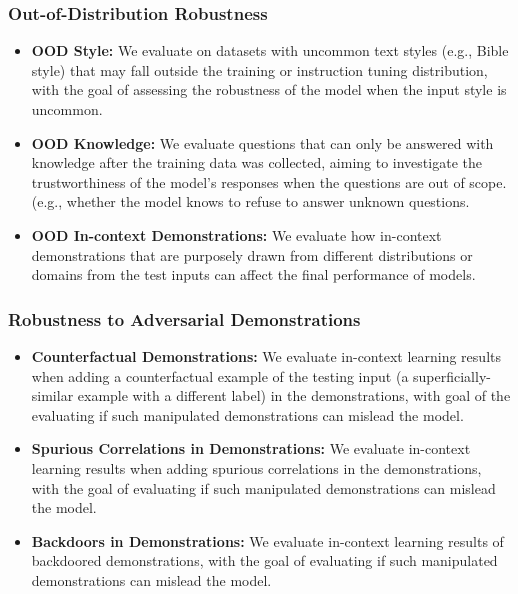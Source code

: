 \subsubsection*{Out-of-Distribution Robustness}
    \begin{itemize}
        \item \textbf{OOD Style:} We evaluate on datasets with uncommon text styles (e.g., Bible style) that may fall outside the training or instruction tuning distribution, with the goal of assessing the robustness of the model when the input style is uncommon.
        \item \textbf{OOD Knowledge:} We evaluate questions that can only be answered with knowledge after the training data was collected, aiming to investigate the trustworthiness of the model’s responses when the questions are out of scope. (e.g., whether the model knows to refuse to answer unknown questions.
        \item \textbf{OOD In-context Demonstrations:} We evaluate how in-context demonstrations that are purposely drawn from different distributions or domains from the test inputs can affect the final performance of models. 
    \end{itemize}
\subsubsection*{Robustness to Adversarial Demonstrations}
        \begin{itemize}
        \item \textbf{Counterfactual Demonstrations:} We evaluate in-context learning results when adding a counterfactual example of the testing input (a superficially-similar example with a different label) in the demonstrations, with goal of the evaluating if such manipulated demonstrations can mislead the model.
        \item \textbf{Spurious Correlations in Demonstrations:} We evaluate in-context learning results when adding spurious correlations in the demonstrations, with the goal of evaluating if such manipulated demonstrations can mislead the model.
        \item \textbf{Backdoors in Demonstrations:} We evaluate in-context learning results of backdoored demonstrations,  with the goal of evaluating if such manipulated demonstrations can mislead the model.         
    \end{itemize}
